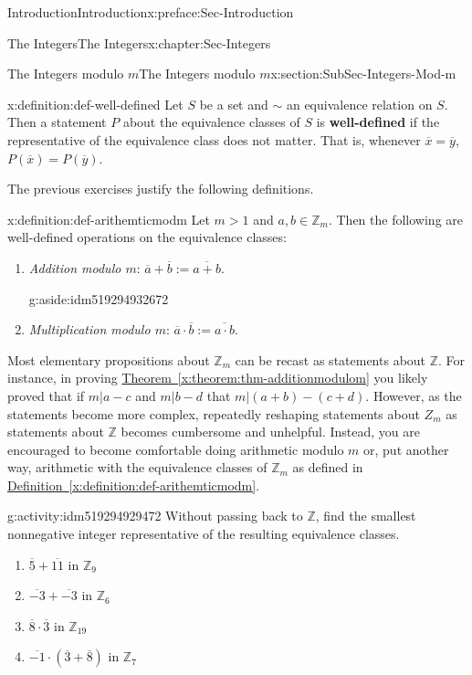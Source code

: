 \documentclass[oneside,10pt,]{book}
\newcommand{\xreffont}{\relax}
\newcommand{\terminology}[1]{\textbf{#1}}
\numberwithin{equation}{section}
\def\Z{{\mathbb Z}}
\begin{document}
\begin{preface}{Introduction}{}{Introduction}{}{}{x:preface:Sec-Introduction}
\begin{chapterptx}{The Integers}{}{The Integers}{}{}{x:chapter:Sec-Integers}
\begin{sectionptx}{The Integers modulo \(m\)}{}{The Integers modulo \(m\)}{}{}{x:section:SubSec-Integers-Mod-m}
\begin{definition}{}{x:definition:def-well-defined}
%
Let \(S\) be a set and \(\sim\) an equivalence relation on \(S\). Then a statement \(P\) about the equivalence classes of \(S\) is \terminology{well-defined} if the representative of the equivalence class does not matter. That is, whenever \(\overline{x} = \overline{y}\), \(P(\overline{x}) = P(\overline{y})\).%
\end{definition}
The previous exercises justify the following definitions.%
\begin{definition}{}{x:definition:def-arithemticmodm}%
Let \(m > 1\) and \(a,b\in \Z_m\). Then the following are well-defined operations on the equivalence classes:%
\begin{enumerate}
\item{}\emph{Addition modulo \(m\)}: \(\overline{a} + \overline{b} := \overline{a+b}\). \begin{aside}{}{g:aside:idm519294932672}%
\end{aside}
%
\item{}\emph{Multiplication modulo \(m\)}: \(\overline{a}\cdot \overline{b} := \overline{a\cdot b}\).%
\end{enumerate}
%
\end{definition}
Most elementary propositions about \(\Z_m\) can be recast as statements about \(\Z\). For instance, in proving \hyperref[x:theorem:thm-additionmodulom]{Theorem~{\xreffont\ref{x:theorem:thm-additionmodulom}}} you likely proved that if \(m|a-c\) and \(m|b-d\) that \(m|(a+b)-(c+d)\). However, as the statements become more complex, repeatedly reshaping statements about \(Z_m\) as statements about \(\Z\) becomes cumbersome and unhelpful. Instead, you are encouraged to become comfortable doing arithmetic modulo \(m\) or, put another way, arithmetic with the equivalence classes of \(\Z_m\) as defined in \hyperref[x:definition:def-arithemticmodm]{Definition~{\xreffont\ref{x:definition:def-arithemticmodm}}}.%
\begin{activity}{}{g:activity:idm519294929472}%
Without passing back to \(\Z\), find the smallest nonnegative integer representative of the resulting equivalence classes.%
%
\begin{enumerate}
\item{}\(\overline{5}+\overline{11}\) in \(\Z_{9}\)%
\item{}\(\overline{-3}+\overline{-3}\) in \(\Z_{6}\)%
\item{}\(\overline{8}\cdot\overline{3}\) in \(\Z_{19}\)%
\item{}\(\overline{-1}\cdot(\overline{3}+\overline{8})\) in \(\Z_{7}\)%

\end{enumerate}
\end{activity}
\end{sectionptx}
\end{chapterptx}
\end{preface}
\end{document}
